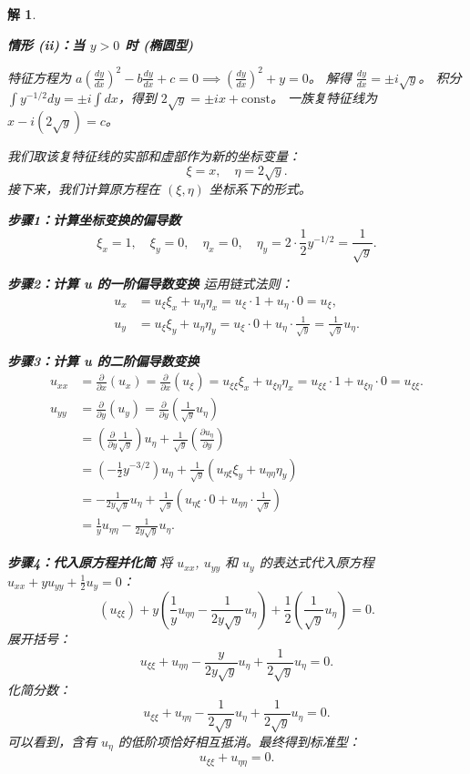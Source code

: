 \documentclass[12pt,a4paper]{article}
\newtheorem*{solution}{解}
\begin{document}
\begin{solution}
\begin{enumerate}[(1)]
		\textbf{情形 (ii)：当 \(y > 0\) 时 (椭圆型)}
		
		特征方程为 \(a(\frac{dy}{dx})^2 - b\frac{dy}{dx} + c = 0 \implies (\frac{dy}{dx})^2 + y = 0\)。
		解得 \(\frac{dy}{dx} = \pm i\sqrt{y}\)。
		积分 \(\int y^{-1/2} dy = \pm i \int dx\)，得到 \(2\sqrt{y} = \pm ix + \text{const}\)。
		一族复特征线为 \(x - i(2\sqrt{y}) = c\)。
		
		我们取该复特征线的实部和虚部作为新的坐标变量：
		\[ \xi = x, \quad \eta = 2\sqrt{y}. \]
		接下来，我们计算原方程在 \((\xi, \eta)\) 坐标系下的形式。
		
		\textbf{步骤1：计算坐标变换的偏导数}
		\[
		\xi_x = 1, \quad \xi_y = 0, \quad \eta_x = 0, \quad \eta_y = 2 \cdot \frac{1}{2}y^{-1/2} = \frac{1}{\sqrt{y}}.
		\]
		
		\textbf{步骤2：计算 u 的一阶偏导数变换}
		运用链式法则：
		\begin{align*}
			u_x &= u_\xi \xi_x + u_\eta \eta_x = u_\xi \cdot 1 + u_\eta \cdot 0 = u_\xi, \\
			u_y &= u_\xi \xi_y + u_\eta \eta_y = u_\xi \cdot 0 + u_\eta \cdot \frac{1}{\sqrt{y}} = \frac{1}{\sqrt{y}} u_\eta.
		\end{align*}
		
		\textbf{步骤3：计算 u 的二阶偏导数变换}
		\begin{align*}
			u_{xx} &= \frac{\partial}{\partial x}(u_x) = \frac{\partial}{\partial x}(u_\xi) = u_{\xi\xi}\xi_x + u_{\xi\eta}\eta_x = u_{\xi\xi} \cdot 1 + u_{\xi\eta} \cdot 0 = u_{\xi\xi}. \\
			u_{yy} &= \frac{\partial}{\partial y}(u_y) = \frac{\partial}{\partial y}\left(\frac{1}{\sqrt{y}} u_\eta\right) \\
			&= \left(\frac{\partial}{\partial y}\frac{1}{\sqrt{y}}\right) u_\eta + \frac{1}{\sqrt{y}} \left(\frac{\partial u_\eta}{\partial y}\right) \\
			&= \left(-\frac{1}{2}y^{-3/2}\right) u_\eta + \frac{1}{\sqrt{y}} \left(u_{\eta\xi}\xi_y + u_{\eta\eta}\eta_y\right) \\
			&= -\frac{1}{2y\sqrt{y}}u_\eta + \frac{1}{\sqrt{y}} \left(u_{\eta\xi} \cdot 0 + u_{\eta\eta} \cdot \frac{1}{\sqrt{y}}\right) \\
			&= \frac{1}{y}u_{\eta\eta} - \frac{1}{2y\sqrt{y}}u_\eta.
		\end{align*}
		
		\textbf{步骤4：代入原方程并化简}
		将 \(u_{xx}\), \(u_{yy}\) 和 \(u_y\) 的表达式代入原方程 \(u_{xx} + y u_{yy} + \frac{1}{2} u_y = 0\)：
		\[
		(u_{\xi\xi}) + y \left(\frac{1}{y}u_{\eta\eta} - \frac{1}{2y\sqrt{y}}u_\eta\right) + \frac{1}{2}\left(\frac{1}{\sqrt{y}} u_\eta\right) = 0.
		\]
		展开括号：
		\[
		u_{\xi\xi} + u_{\eta\eta} - \frac{y}{2y\sqrt{y}}u_\eta + \frac{1}{2\sqrt{y}}u_\eta = 0.
		\]
		化简分数：
		\[
		u_{\xi\xi} + u_{\eta\eta} - \frac{1}{2\sqrt{y}}u_\eta + \frac{1}{2\sqrt{y}}u_\eta = 0.
		\]
		可以看到，含有 \(u_\eta\) 的低阶项恰好相互抵消。最终得到标准型：
		\[ u_{\xi\xi} + u_{\eta\eta} = 0. \]
			

\end{enumerate}
\end{solution}
\end{document}
